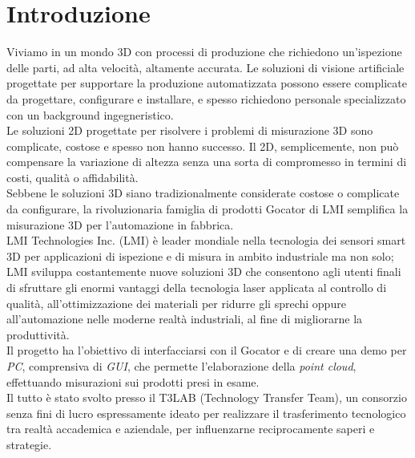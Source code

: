 \chapter{Introduzione}
\label{Cha:introduzione}
\thispagestyle{empty}

Viviamo in un mondo 3D con processi di produzione che richiedono un'ispezione delle parti, ad alta velocità, altamente accurata. Le soluzioni di visione artificiale progettate per supportare la produzione automatizzata possono essere complicate da progettare, configurare e installare, e spesso richiedono personale specializzato con un background ingegneristico.\\
\newline
Le soluzioni 2D progettate per risolvere i problemi di misurazione 3D sono complicate, costose e spesso non hanno successo. Il 2D, semplicemente, non può compensare la variazione di altezza senza una sorta di compromesso in termini di costi, qualità o affidabilità.\\
\newline
Sebbene le soluzioni 3D siano tradizionalmente considerate costose o complicate da configurare, la rivoluzionaria famiglia di prodotti Gocator di LMI semplifica la misurazione 3D per l'automazione in fabbrica.\\
\newline
LMI Technologies Inc. (LMI) è leader mondiale nella tecnologia dei sensori smart 3D per applicazioni di ispezione e di misura in ambito industriale ma non solo; LMI sviluppa costantemente nuove soluzioni 3D che consentono agli utenti finali di sfruttare gli enormi vantaggi della tecnologia laser applicata al controllo di qualità, all'ottimizzazione dei materiali per ridurre gli sprechi oppure all'automazione nelle moderne realtà industriali, al fine di migliorarne la produttività.\\
\newline
Il progetto ha l'obiettivo di interfacciarsi con il Gocator e di creare una demo per \textit{PC}, comprensiva di \textit{GUI}, che permette l'elaborazione della \textit{point cloud}, effettuando misurazioni sui prodotti presi in esame.\\
\newline
Il tutto è stato svolto presso il T3LAB (Technology Transfer Team), un consorzio senza fini di lucro espressamente ideato per realizzare il trasferimento tecnologico tra realtà accademica e aziendale, per influenzarne reciprocamente saperi e strategie.\\


